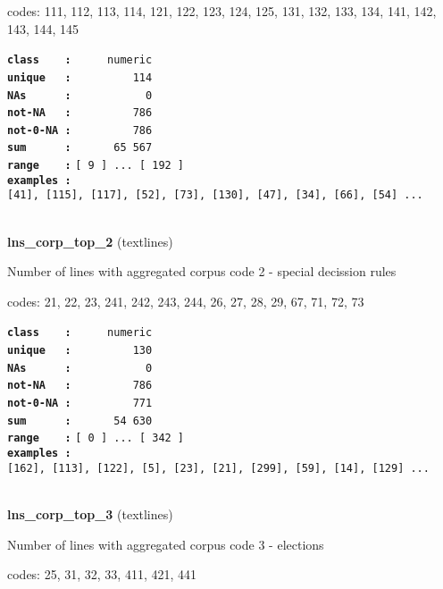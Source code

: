 \documentclass[]{article}
\begin{document}
codes: 111, 112, 113, 114, 121, 122, 123, 124, 125, 131, 132, 133, 134,
141, 142, 143, 144, 145

\textbf{\texttt{class\ \ \ \ :}} \texttt{~~~~~numeric}\\
\textbf{\texttt{unique\ \ \ :}} \texttt{~~~~~~~~~114}\\
\textbf{\texttt{NAs\ \ \ \ \ \ :}} \texttt{~~~~~~~~~~~0}\\
\textbf{\texttt{not-NA\ \ \ :}} \texttt{~~~~~~~~~786}\\
\textbf{\texttt{not-0-NA\ :}} \texttt{~~~~~~~~~786}\\
\textbf{\texttt{sum\ \ \ \ \ \ :}} \texttt{~~~~~~65~567}\\
\textbf{\texttt{range\ \ \ \ :}}
\texttt{{[}\ 9\ {]}\ ...\ {[}\ 192\ {]}}\\
\textbf{\texttt{examples\ :}}
\texttt{{[}41{]},\ {[}115{]},\ {[}117{]},\ {[}52{]},\ {[}73{]},\ {[}130{]},\ {[}47{]},\ {[}34{]},\ {[}66{]},\ {[}54{]}\ ...}\\

~

\textbf{lns\_corp\_top\_2} (textlines)

Number of lines with aggregated corpus code 2 - special decission rules

codes: 21, 22, 23, 241, 242, 243, 244, 26, 27, 28, 29, 67, 71, 72, 73

\textbf{\texttt{class\ \ \ \ :}} \texttt{~~~~~numeric}\\
\textbf{\texttt{unique\ \ \ :}} \texttt{~~~~~~~~~130}\\
\textbf{\texttt{NAs\ \ \ \ \ \ :}} \texttt{~~~~~~~~~~~0}\\
\textbf{\texttt{not-NA\ \ \ :}} \texttt{~~~~~~~~~786}\\
\textbf{\texttt{not-0-NA\ :}} \texttt{~~~~~~~~~771}\\
\textbf{\texttt{sum\ \ \ \ \ \ :}} \texttt{~~~~~~54~630}\\
\textbf{\texttt{range\ \ \ \ :}}
\texttt{{[}\ 0\ {]}\ ...\ {[}\ 342\ {]}}\\
\textbf{\texttt{examples\ :}}
\texttt{{[}162{]},\ {[}113{]},\ {[}122{]},\ {[}5{]},\ {[}23{]},\ {[}21{]},\ {[}299{]},\ {[}59{]},\ {[}14{]},\ {[}129{]}\ ...}\\

~

\textbf{lns\_corp\_top\_3} (textlines)

Number of lines with aggregated corpus code 3 - elections

codes: 25, 31, 32, 33, 411, 421, 441
\end{document}
